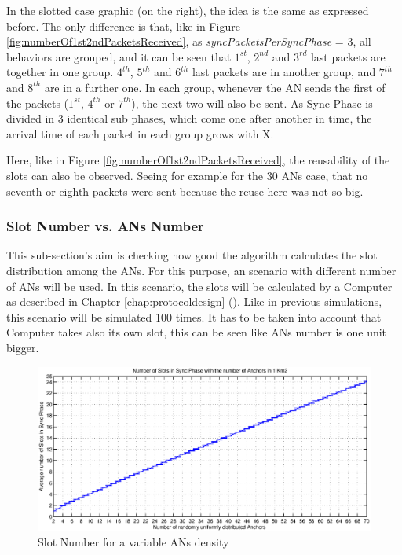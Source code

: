 In the slotted case graphic (on the right), the idea is the same as expressed before. The only difference is that, like in Figure 
\ref{fig:numberOf1st2ndPacketsReceived}, as \textit{syncPacketsPerSyncPhase} = 3, all behaviors are grouped, and it can be seen that $1^{st}$, 
$2^{nd}$ and $3^{rd}$ last packets are together in one group. $4^{th}$, $5^{th}$ and $6^{th}$ last packets are in another group, and 
$7^{th}$ and $8^{th}$ are in a further one. In each group, whenever the \ac{AN} sends the first of the packets ($1^{st}$, $4^{th}$ or $7^{th}$), the 
next two will also be sent. As Sync Phase is divided in 3 identical sub phases, which come one after another in time, the arrival time of 
each packet in each group grows with X.

Here, like in Figure \ref{fig:numberOf1st2ndPacketsReceived}, the reusability of the slots can also be observed. Seeing for example for the 
30 \acp{AN} case, that no seventh or eighth packets were sent because the reuse here was not so big.

\subsubsection{Slot Number vs. \acp{AN} Number}

This sub-section's aim is checking how good the algorithm calculates the slot distribution among the \acp{AN}. For this purpose, an scenario 
with different number of \acp{AN} will be used. In this scenario, the slots will be calculated by a Computer as described in Chapter 
\ref{chap:protocoldesign} (). Like in previous simulations, this scenario will be simulated 100 times. It has to
be taken into account that Computer takes also its own slot, this can be seen like \acp{AN} number is one unit bigger.

\begin{figure}[ht]
 \begin{center}
  \includegraphics[width=1\textwidth]{numberOfSlotsWithTheAnchorDensity.eps}
 \end{center}
 \caption{Slot Number for a variable \acp{AN} density}
 \label{fig:numberOfSlotsWithTheAnchorDensity}
\end{figure}

